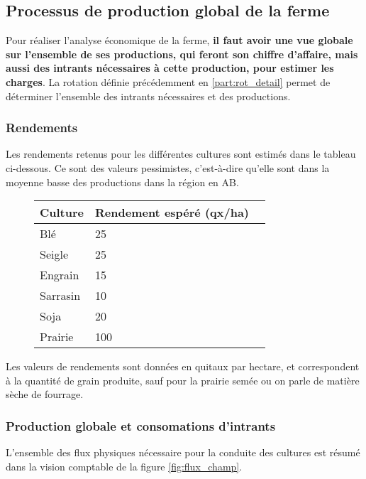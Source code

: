 \documentclass{book}
\begin{document}
\subsection{Processus de production global de la ferme}

Pour réaliser l'analyse économique de la ferme, \textbf{il faut avoir une vue globale sur l'ensemble de ses productions, qui feront son chiffre d'affaire, mais aussi des intrants nécessaires à cette production, pour estimer les charges}. La rotation définie précédemment en \ref{part:rot_detail} permet de déterminer l'ensemble des intrants nécessaires et des productions. 

\subsubsection{Rendements}

Les rendements retenus pour les différentes cultures sont estimés dans le tableau ci-dessous. Ce sont des valeurs pessimistes, c'est-à-dire qu'elle sont dans la moyenne basse des productions dans la région en AB.
 
\begin{figure}[h!]
\footnotesize
\center
\begin{tabular}{ | p{3cm} | p{4cm}|}
\hline
	\textbf{Culture} & \textbf{Rendement espéré (qx/ha)} \  \\ \hline
	Blé & 25 \\ \hline
	Seigle & 25 \\ \hline
	Engrain & 15 \\ \hline
	Sarrasin & 10 \\ \hline
	Soja & 20 \\ \hline
	Prairie & 100 \\ \hline
\end{tabular}
\end{figure}

Les valeurs de rendements sont données en quitaux par hectare, et correspondent à la quantité de grain produite, sauf pour la prairie semée ou on parle de matière sèche de fourrage.

\subsubsection{Production globale et consomations d'intrants}

L'ensemble des flux physiques nécessaire pour la conduite des cultures est résumé dans la vision comptable de la figure \ref{fig:flux_champ}. 
\end{document}
